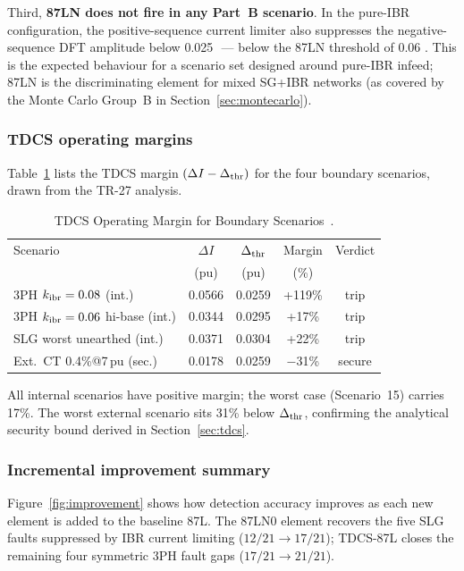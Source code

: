 \documentclass[journal,twoside,10pt]{IEEEtran}
\newcommand{\pu}{\,\text{p.u.}}
\begin{document}
Third, \textbf{87LN does not fire in any Part~B scenario}.
In the pure-IBR configuration, the positive-sequence current limiter
also suppresses the negative-sequence DFT amplitude below 0.025\,\pu
--- below the 87LN threshold of 0.06\,\pu.  This is the expected
behaviour for a scenario set designed around pure-IBR infeed; 87LN
is the discriminating element for mixed SG+IBR networks (as covered
by the Monte Carlo Group~B in Section~\ref{sec:montecarlo}).

\subsubsection{TDCS operating margins}

Table~\ref{tab:tdcs_margin} lists the TDCS margin
$(\Delta I - \Delta_{\rm thr})$ for the four boundary scenarios,
drawn from the TR-27 analysis.

\begin{table}[!t]
\centering
\caption{TDCS Operating Margin for Boundary Scenarios~\cite{SAMBP_TR27}.}
\label{tab:tdcs_margin}
\setlength{\tabcolsep}{4pt}
\renewcommand{\arraystretch}{1.08}
\begin{tabular}{lcccc}
\toprule
Scenario & $\Delta I$ & $\Delta_{\rm thr}$ & Margin & Verdict \\
         & (pu) & (pu) & (\%) & \\
\midrule
3PH $k_{\rm ibr}=0.08$ (int.) & 0.0566 & 0.0259 & +119\% & trip \\
3PH $k_{\rm ibr}=0.06$ hi-base (int.) & 0.0344 & 0.0295 & +17\%  & trip \\
SLG worst unearthed (int.)    & 0.0371 & 0.0304 & +22\%  & trip \\
Ext.\ CT 0.4\%@7\,pu (sec.)  & 0.0178 & 0.0259 & $-$31\%& secure \\
\bottomrule
\end{tabular}
\end{table}

All internal scenarios have positive margin; the worst case (Scenario~15)
carries 17\%.  The worst external scenario sits 31\% below
$\Delta_{\rm thr}$, confirming the analytical security bound derived in
Section~\ref{sec:tdcs}.

\subsubsection{Incremental improvement summary}

Figure~\ref{fig:improvement} shows how detection accuracy improves as
each new element is added to the baseline 87L.  The 87LN0 element recovers
the five SLG faults suppressed by IBR current limiting
($12/21 \to 17/21$); TDCS-87L closes the remaining four symmetric 3PH
fault gaps ($17/21 \to 21/21$).
\end{document}
